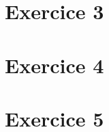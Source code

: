 \documentclass[a4paper, frenchb, 11pt]{article}
\begin{document}
\newpage

\section*{Exercice 3}
\newpage

\section*{Exercice 4}
\newpage

\section*{Exercice 5}
\newpage

\renewcommand\refname{Ressources utilisées}
\begin{thebibliography}{5} %
\end{thebibliography}
\end{document}
